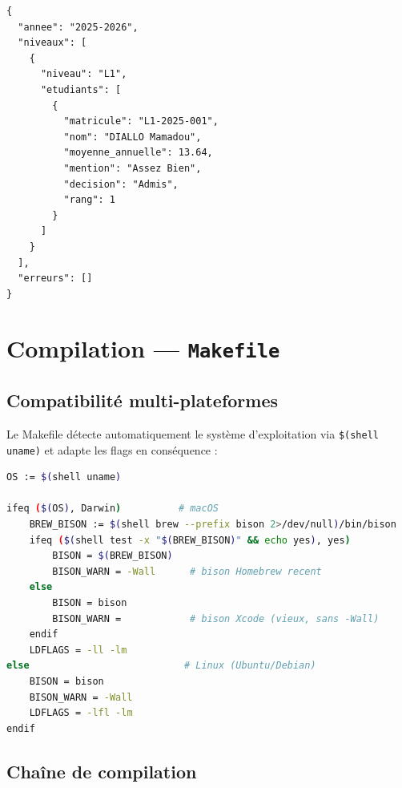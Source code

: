 \documentclass[10pt,a4paper]{article}
\begin{document}
\begin{tcolorbox}[okbox, title={Exemple de sortie JSON pour \texttt{test\_valide.sgn}}]
\begin{lstlisting}[style=styleJSON, numbers=none, frame=none, backgroundcolor=\color{green!5}]
{
  "annee": "2025-2026",
  "niveaux": [
    {
      "niveau": "L1",
      "etudiants": [
        {
          "matricule": "L1-2025-001",
          "nom": "DIALLO Mamadou",
          "moyenne_annuelle": 13.64,
          "mention": "Assez Bien",
          "decision": "Admis",
          "rang": 1
        }
      ]
    }
  ],
  "erreurs": []
}
\end{lstlisting}
\end{tcolorbox}

\section{Compilation --- \texttt{Makefile}}

\subsection{Compatibilité multi-plateformes}

Le Makefile détecte automatiquement le système d'exploitation via \texttt{\$(shell uname)}
et adapte les flags en conséquence :

\begin{lstlisting}[language=bash, caption={Détection OS dans le Makefile}]
OS := $(shell uname)

ifeq ($(OS), Darwin)          # macOS
    BREW_BISON := $(shell brew --prefix bison 2>/dev/null)/bin/bison
    ifeq ($(shell test -x "$(BREW_BISON)" && echo yes), yes)
        BISON = $(BREW_BISON)
        BISON_WARN = -Wall      # bison Homebrew recent
    else
        BISON = bison
        BISON_WARN =            # bison Xcode (vieux, sans -Wall)
    endif
    LDFLAGS = -ll -lm
else                           # Linux (Ubuntu/Debian)
    BISON = bison
    BISON_WARN = -Wall
    LDFLAGS = -lfl -lm
endif
\end{lstlisting}

\subsection{Chaîne de compilation}
\end{document}
